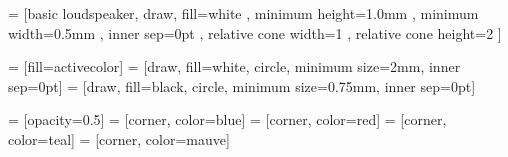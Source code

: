 
 = [basic loudspeaker, draw, fill=white
, minimum height=1.0mm 	    %
, minimum width=0.5mm		    %
, inner sep=0pt
, relative cone width=1	%
, relative cone height=2	    %
]

 = [fill=activecolor]
 = [draw, fill=white, circle, minimum size=2mm, inner sep=0pt]
 = [draw, fill=black, circle, minimum size=0.75mm, inner 
sep=0pt]

 = [opacity=0.5]
 = [corner, color=blue]
 = [corner, color=red]
 = [corner, color=teal]
 = [corner, color=mauve]

